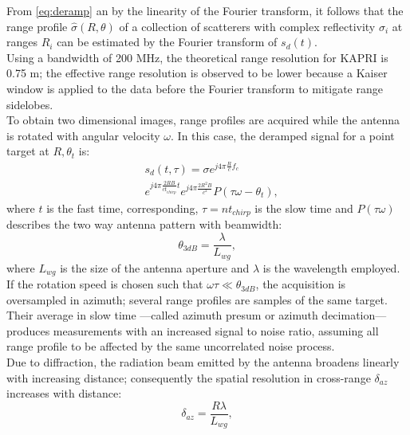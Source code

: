 From \eqref{eq:deramp} an by the linearity of the Fourier transform, it follows that the range profile $\hat{\sigma}\left(R, \theta\right)$ of a collection of scatterers with complex reflectivity $\sigma_i$ at ranges $R_{i}$ can be estimated by the Fourier transform of $s_{d}\left(t\right)$.\\
Using a bandwidth of 200 MHz, the theoretical range resolution for KAPRI is 0.75 m\cite{Strozzi2011}; the effective range resolution is observed to be lower because a Kaiser window is applied to the data before the Fourier transform to mitigate range sidelobes.\\
To obtain two dimensional images, range profiles are acquired while the antenna is rotated with angular velocity $\omega$. 
In this case, the deramped signal for a point target at $R,\theta_t$ is:
\begin{equation}\label{eq:signal_model}
	\begin{aligned}
	& s_{d}\left(t,\tau\right) = \sigma e^{j 4 \pi \frac{ R}{c}f_c}   \\
	& e^{j 4 \pi \frac{2 R B }{c t_{chirp}} t}  e^{j 4 \pi \frac{2 R^2 B}{c^2}} P\left(\tau \omega - \theta_t\right),
	\end{aligned}
\end{equation} 
where $t$ is the fast time, corresponding, $\tau = n t_{chirp}$ is the slow time and $P\left(\tau \omega\right)$ describes the two way antenna pattern with beamwidth:
\begin{equation}\label{eq:azimuth_resolution}
	\theta_{3dB} = \frac{\lambda}{L_{wg}},
\end{equation}
where $L_{wg}$ is the size of the antenna aperture and $\lambda$ is the wavelength employed.
If the rotation speed is chosen such that $\omega \tau \ll \theta_{3dB}$, the acquisition is oversampled in azimuth; several range profiles are samples of the same target. Their average in slow time  ---called azimuth presum or azimuth decimation--- produces measurements with an increased signal to noise ratio, assuming all range profile to be affected by the same uncorrelated noise process.\\
Due to diffraction, the radiation beam emitted by the antenna broadens linearly with increasing distance; consequently the spatial resolution in cross-range $\delta_{az}$ increases with distance:
\begin{equation}\label{eq:azimuth_ground_resolution}
	\delta_{az} = \frac{R \lambda}{L_{wg}},
\end{equation}
